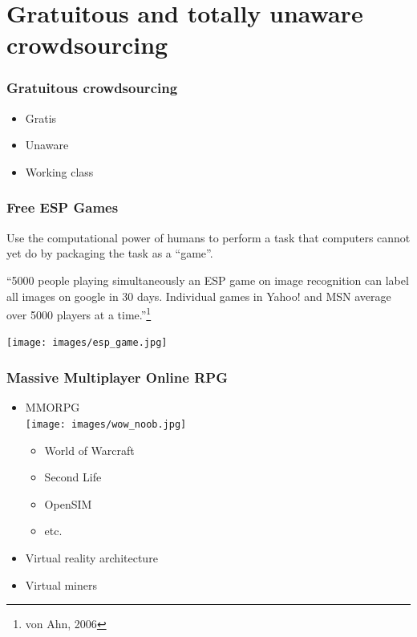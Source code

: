 \documentclass{beamer}
\begin{document}
\section{Gratuitous and totally unaware crowdsourcing}
\label{sec-3}
\begin{frame}
\frametitle{Gratuitous crowdsourcing}
\label{sec-3_1}

\begin{itemize}
\item Gratis
\item Unaware
\item Working class
\end{itemize}
\end{frame}
\begin{frame}
\frametitle{Free ESP Games}
\label{sec-3_2}


Use the computational power of humans to perform a task that computers
cannot yet do by packaging the task as a ``game''.

  ``5000 people playing simultaneously an ESP game on image recognition
   can  label all images  on google  in 30  days. Individual  games in
   Yahoo!  and  MSN average over 5000  players at a  time.''\footnote{von Ahn, 2006 }

\texttt{[image: images/esp\_game.jpg]}
\end{frame}
\begin{frame}
\frametitle{Massive Multiplayer Online RPG}
\label{sec-3_3}
\begin{itemize}

\item MMORPG\\
\label{sec-3_3_1}%
\texttt{[image: images/wow\_noob.jpg]}

\begin{itemize}
\item World of Warcraft
\item Second Life
\item OpenSIM
\item etc.
\end{itemize}




\item Virtual reality architecture\\
\label{sec-3_3_2}%
\item Virtual miners\\
\label{sec-3_3_3}%
\end{itemize} %
\end{frame}
\end{document}
